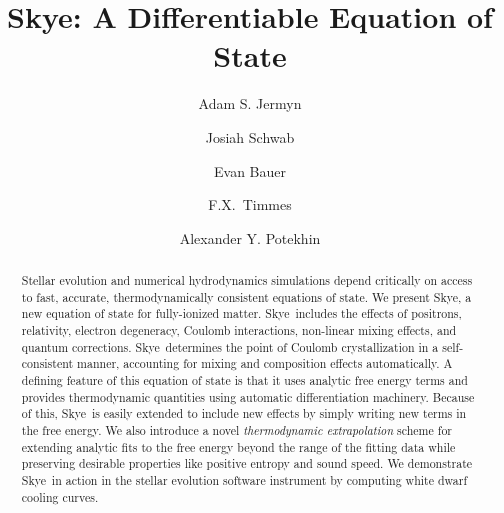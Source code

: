 \documentclass[twocolumn]{aastex631}
\newcommand{\skye}{Skye}
\begin{document}
\title{Skye: A Differentiable Equation of State}


\author[0000-0001-5048-9973]{Adam S. Jermyn}
\affiliation{}

\author[0000-0002-4870-8855]{Josiah Schwab}

\author[0000-0002-4791-6724]{Evan Bauer}

\author[0000-0002-0474-159X]{F.X.~Timmes}

\author[0000-0001-9955-4684]{Alexander Y. Potekhin}


\begin{abstract}
Stellar evolution and numerical hydrodynamics simulations depend critically on access to fast, accurate, thermodynamically consistent equations of state.
We present \skye, a new equation of state for fully-ionized matter.
\skye\ includes the effects of positrons, relativity, electron degeneracy, Coulomb interactions, non-linear mixing effects, and quantum corrections.
\skye\ determines the point of Coulomb crystallization in a self-consistent manner, accounting for mixing and composition effects automatically.
A defining feature of this equation of state is that it uses analytic free energy terms and provides thermodynamic quantities using automatic differentiation machinery.
Because of this, \skye\ is easily extended to include new effects by simply writing new terms in the free energy.
We also introduce a novel \emph{thermodynamic extrapolation} scheme for extending analytic fits to the free energy beyond the range of the fitting data while preserving desirable properties like positive entropy and sound speed.
We demonstrate \skye\ in action in the  stellar evolution software instrument by computing white dwarf cooling curves.
\end{abstract}
\end{document}
